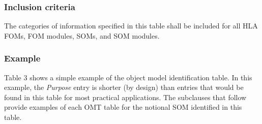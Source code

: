 \newpage

\subsubsection{Inclusion criteria}
The categories of information specified in this table shall be included for all HLA FOMs, FOM modules, SOMs, and SOM modules.

\subsubsection{Example}
Table 3 shows a simple example of the object model identification table. In this example, the \textit{Purpose} entry is shorter (by design) than entries that would be found in this table for most practical applications. The subclauses that follow provide examples of each OMT table for the notional SOM identified in this table.

